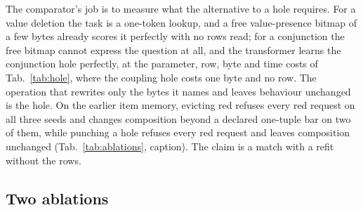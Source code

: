 \documentclass{article} %
\begin{document}
\noindent The comparator's job is to measure what the alternative to a hole requires. For a value
deletion the task is a one-token lookup, and a free value-presence bitmap of a few bytes already scores
it perfectly with no rows read; for a conjunction the free bitmap cannot express the question at
all, and the transformer learns the conjunction hole perfectly, at the parameter, row, byte and time
costs of Tab.~\ref{tab:hole}, where the coupling hole costs one
byte and no row. %
\noindent The operation that rewrites only the bytes it names and leaves behaviour unchanged is the
hole. On the earlier item memory, evicting red refuses every red request on all three
seeds and changes composition beyond a declared one-tuple bar on two of them,
while punching a hole refuses every red request and leaves composition unchanged (Tab.~\ref{tab:ablations}, caption). %
The claim is a match with a refit without the rows.

\subsection{Two ablations}
\label{sec:ablations}
\end{document}
